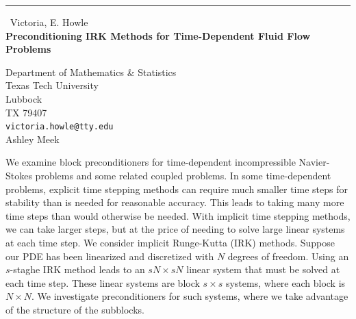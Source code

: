 \documentclass{report}
\begin{document}
\begin{center}
\rule{6in}{1pt} \
{\large Victoria, E. Howle \\
{\bf Preconditioning IRK Methods for Time-Dependent Fluid Flow Problems}}

Department of Mathematics \& Statistics \\ Texas Tech University \\ Lubbock \\ TX 79407
\\
{\tt victoria.howle@tty.edu}\\
Ashley Meek\end{center}

We examine block preconditioners for time-dependent incompressible
Navier-Stokes problems and some related coupled problems. In some
time-dependent problems, explicit time stepping methods can require much
smaller time steps for stability than is needed for reasonable accuracy.
This leads to taking many more time steps than would otherwise be needed.
With implicit time stepping methods, we can take larger steps, but at the
price of needing to solve large linear systems at each time step. We
consider implicit Runge-Kutta (IRK) methods. Suppose our PDE has been
linearized and discretized with $N$ degrees of freedom. Using an
$s$-staghe IRK method leads to an $s N \times s N$ linear system that
must be solved at each time step. These linear systems are block $s \times
s$ systems, where each block is $N \times N$. We investigate
preconditioners for such systems, where we take advantage of the
structure of the subblocks.
\end{document}
